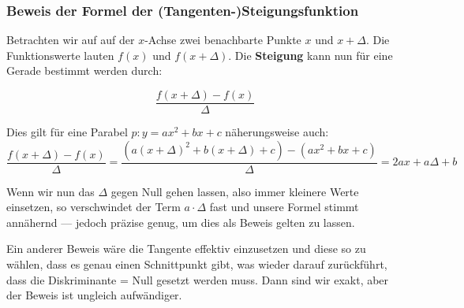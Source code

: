 \subsubsection{Beweis der Formel der (Tangenten-)Steigungsfunktion}

Betrachten wir auf auf der $x$-Achse zwei benachbarte Punkte $x$ und
$x+\Delta$. Die Funktionswerte lauten $f(x)$ und $f(x+\Delta)$. Die
\textbf{Steigung} kann nun für eine Gerade bestimmt werden durch:


$$\frac{f(x+\Delta) - f(x)}{\Delta}$$

Dies gilt für eine Parabel $p: y=ax^2+bx+c$ näherungsweise auch:
$$\frac{f(x+\Delta)-f(x)}{\Delta} = \frac{(a(x+\Delta)^2 + b(x+\Delta)
  + c) - (ax^2 + bx +c)}{\Delta}=2ax+a\Delta+b$$

Wenn wir nun das $\Delta$ gegen Null gehen lassen, also immer kleinere
Werte einsetzen, so verschwindet der Term $a\cdot{}\Delta$ fast und unsere
Formel stimmt annähernd --- jedoch präzise genug, um dies als Beweis
gelten zu lassen.

Ein anderer Beweis wäre die Tangente effektiv einzusetzen und diese so
zu wählen, dass es genau einen Schnittpunkt gibt, was wieder darauf
zurückführt, dass die Diskriminante = Null gesetzt werden muss. Dann
sind wir exakt, aber der Beweis ist ungleich aufwändiger.
\newpage

